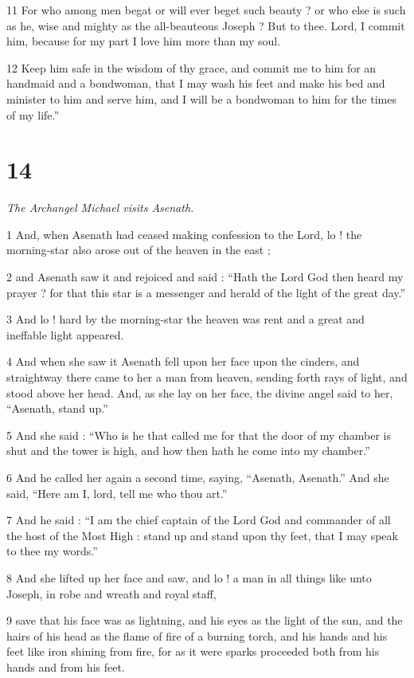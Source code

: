 11 For who among men begat or will ever beget such beauty ? or who else is such as he, wise and mighty as the all-beauteous Joseph ? But to thee. Lord, I commit him, because for my part I love him more than my soul. 

12 Keep him safe in the wisdom of thy grace, and commit me to him for an handmaid and a bondwoman, that I may wash his feet and make his bed and minister to him and serve him, and I will be a bondwoman to him for the times of my life.”

\chapter{14}

\par \textit{The Archangel Michael visits Asenath.}

1 And, when Asenath had ceased making confession to the Lord, lo ! the morning-star also arose out of the heaven in the east ; 

2 and Asenath saw it and rejoiced and said : “Hath the Lord God then heard my prayer ? for that this star is a messenger and herald of the light of the great day.” 

3 And lo ! hard by the morning-star the heaven was rent and a great and ineffable light appeared. 

4 And when she saw it Asenath fell upon her face upon the cinders, and straightway there came to her a man from heaven, sending forth rays of light, and stood above her head. And, as she lay on her face, the divine angel said to her, “Asenath, stand up.” 

5 And she said : “Who is he that called me for that the door of my chamber is shut and the tower is high, and how then hath he come into my chamber.” 

6 And he called her again a second time, saying, “Asenath, Asenath.” And she said, “Here am I, lord, tell me who thou art.” 

7 And he said : “I am the chief captain of the Lord God and commander of all the host of the Most High : stand up and stand upon thy feet, that I may speak to thee my words.” 

8 And she lifted up her face and saw, and lo ! a man in all things like unto Joseph, in robe and wreath and royal staff, 

9 save that his face was as lightning, and his eyes as the light of the sun, and the hairs of his head as the flame of fire of a burning torch, and his hands and his feet like iron shining from fire, for as it were sparks proceeded both from his hands and from his feet. 

